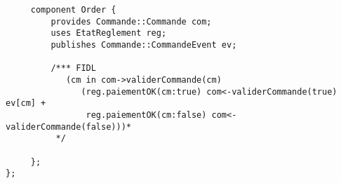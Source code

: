 \begin{lstlisting}
     component Order {
         provides Commande::Commande com;
         uses EtatReglement reg;
         publishes Commande::CommandeEvent ev;

         /*** FIDL
            (cm in com->validerCommande(cm) 
               (reg.paiementOK(cm:true) com<-validerCommande(true) ev[cm] +
                reg.paiementOK(cm:false) com<-validerCommande(false)))*
          */
            
     };
};
\end{lstlisting}


